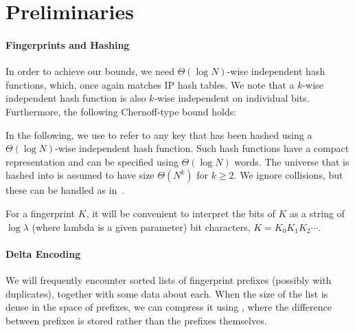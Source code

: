 \section{Preliminaries}\label{sec:boa-prelim}

\paragraph{Fingerprints and Hashing}\label{sec:hashing}
In order to achieve our bounds, we need $\Theta(\log N)$-wise independent hash
functions, which, once again matches IP hash tables.  We note that a $k$-wise
independent hash function is also $k$-wise independent on individual bits.
Furthermore, the following Chernoff-type bound holds:


In the following, we use  to refer to any
key that has been hashed using a $\Theta(\log N)$-wise independent hash
function. Such hash functions have a compact representation and can be specified
using $\Theta(\log N)$ words. The universe that is hashed into is assumed to
have size $\Theta(N^k)$ for $k\geq2$. We ignore collisions, but these can be
handled as in~\cite{DBLP:conf/soda/IaconoP12}.

For a fingerprint $K$, it will be convenient to interpret the bits of $K$ as a
string of $\log \lambda$ (where lambda is a given parameter) bit characters,
$K=K_0K_1K_2\cdots$.

\paragraph{Delta Encoding}\label{sec:delta-encoding}
We will frequently encounter sorted lists of fingerprint prefixes (possibly
with duplicates), together with some data about each. When the size of the list
is dense in the space of prefixes, we can compress it using , where the difference between prefixes is stored rather than the
prefixes themselves.


